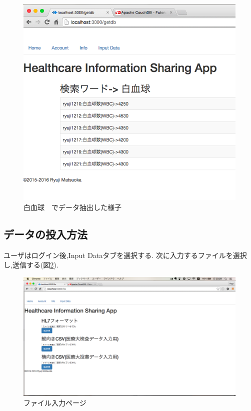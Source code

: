 		\begin{figure}[htbp]
			\begin{center}
				\includegraphics[width=15cm, bb=0 0 652 603, clip]{./gazou/getdb2.png}
			\end{center}
			\caption{白血球　でデータ抽出した様子}
			\label{getdb}
		\end{figure}



\subsection{データの投入方法}
	ユーザはログイン後,Input Dataタブを選択する.
	次に入力するファイルを選択し,送信する(図\ref{fileiopage}).

	\begin{figure}[htbp]
			\includegraphics[width=15cm, bb=0 0 1366 1078, clip]{./gazou/fileiopage.png}
		\caption{ファイル入力ページ}
		\label{fileiopage}
	\end{figure}

